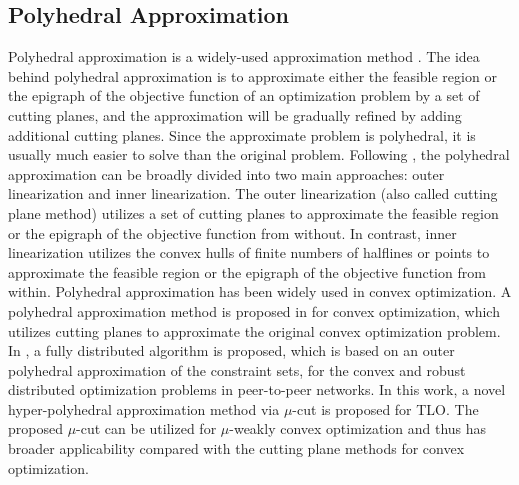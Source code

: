 \documentclass[letterpaper]{article}
\begin{document}
\subsection{Polyhedral Approximation}
Polyhedral approximation is a widely-used approximation method \cite{bertsekas2015convex}. The idea behind polyhedral approximation is to approximate either the feasible region or the
epigraph of the objective function of an optimization problem by a set of cutting planes, and the approximation will be gradually refined by adding additional cutting planes. Since the approximate problem is polyhedral, it is usually much easier to solve than the original problem. Following \cite{bertsekas2015convex}, the polyhedral approximation can be broadly divided into two main approaches: outer linearization and inner linearization. The outer linearization \cite{tawarmalani2005polyhedral,yang2008distributed,burger2013polyhedral} (also called cutting plane method) utilizes a set of cutting planes to approximate the feasible region or the
epigraph of the objective function from
without. In contrast, inner linearization \cite{bertsekas2011unifying,trombettoni2011inner} utilizes the convex hulls
of finite numbers of halflines or points to approximate the feasible region or the
epigraph of the objective function from within. Polyhedral approximation has been widely used in convex optimization. A polyhedral approximation method is proposed in \cite{bertsekas2015convex} for convex optimization, which utilizes cutting planes to approximate the original convex optimization problem. In \cite{burger2013polyhedral}, a fully distributed
algorithm is proposed, which is based on an outer polyhedral approximation of
the constraint sets, for the convex and robust distributed optimization
problems in peer-to-peer networks.  In this work, a novel hyper-polyhedral approximation method via $\mu$-cut is proposed for TLO. The proposed $\mu$-cut can be utilized for $\mu$-weakly convex optimization and thus has broader applicability compared with the cutting plane methods for convex optimization.
\end{document}
